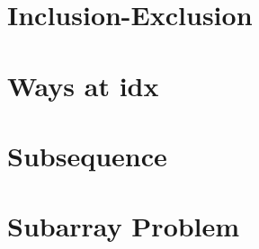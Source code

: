 \part{Inclusion-Exclusion}



\part{Ways at idx}


\part{Subsequence}





\part{Subarray Problem}





